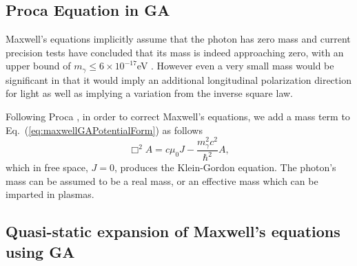 \documentclass[12pt,aps,prb,preprint]{revtex4}   %
\newcommand{\be}{\begin{equation}}
\newcommand{\ee}{\end{equation}}
\begin{document}
\subsection{Proca Equation in GA}

Maxwell's equations implicitly assume that the photon has zero mass and current precision tests have concluded that its mass is indeed approaching zero, with an upper bound of $ m_{\gamma} \le 6 \times 10^{-17} $eV \cite{Tu2005}.  However even a very small mass would be significant in that it would imply an additional longitudinal polarization direction for light as well as implying a variation from the inverse square law.

Following Proca \cite{Gondran2009}, in order to correct Maxwell's equations, we add a mass term to Eq.~(\ref{eq:maxwellGAPotentialForm}) as follows 
\be \label{ProcaPotential}
\Box^2 A =  c \mu_0 J - \frac{m_{\gamma}^2 c^2}{\hbar^2} A ,
\ee
which in free space, $ J = 0 $, produces the Klein-Gordon equation.
The photon's mass can be assumed to be a real mass, or an effective mass which can be imparted in plasmas.




\subsection{Quasi-static expansion of Maxwell's equations using GA}
\end{document}
